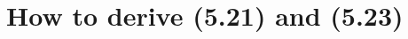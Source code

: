 \documentclass[dvipdfmx,11pt,a4paper,oneside,openany]{jsbook}
\begin{document}


\newcommand{\ctext}[1]{\raise0.2ex\hbox{\textcircled{\scriptsize{#1}}}}

\renewcommand{\figurename}{Fig. }

\renewcommand{\thefigure}{\arabic{figure}}

\renewcommand{\theequation}{5.\arabic{equation}}

\setcounter{chapter}{4}
\appendix
\def\thesection{Appendix \Alph{section}}
\setcounter{section}{1}
\section{How to derive (5.21) and (5.23)}
\end{document}
